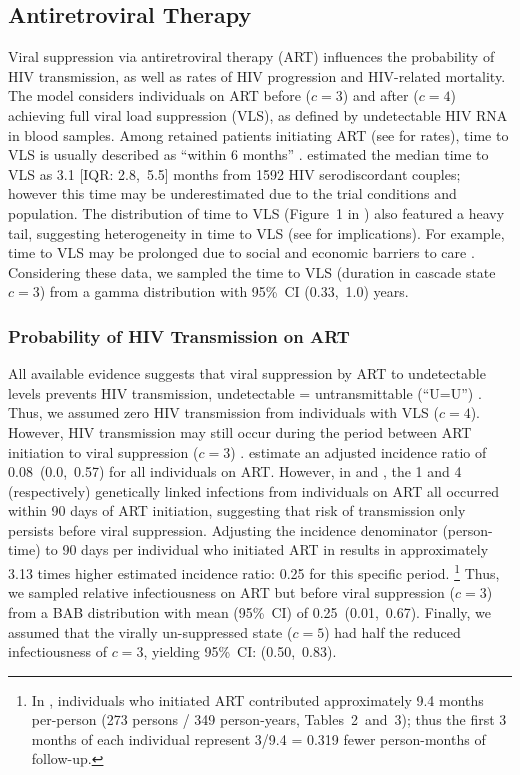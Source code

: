 \subsection{Antiretroviral Therapy}\label{mod.par.art}
Viral suppression via antiretroviral therapy (ART) influences
the probability of HIV transmission, as well as rates of HIV progression and HIV-related mortality.
The model considers individuals on ART before ($c=3$) and after ($c=4$)
achieving full viral load suppression (VLS), as defined by undetectable HIV RNA in blood samples.
Among retained patients initiating ART (see  for rates), time to VLS
is usually described as ``within 6 months'' \cite{Thompson2012}.
\citet{Mujugira2016} estimated the median time to VLS as 3.1 [IQR: 2.8,~5.5] months
from 1592 HIV serodiscordant couples;
however this time may be underestimated due to the trial conditions and population.
The distribution of time to VLS (Figure~1 in \cite{Mujugira2016}) also featured a heavy tail,
suggesting heterogeneity in time to VLS (see  for implications).
For example, time to VLS may be prolonged due to social and economic barriers to care
\cite{Dlamini-Simelane2017,Horter2019}.
Considering these data, we sampled the time to VLS (duration in cascade state $c=3$)
from a gamma distribution with 95\%~CI (0.33,~1.0) years.
\subsubsection{Probability of HIV Transmission on ART}\label{mod.par.art.beta}
All available evidence suggests that viral suppression by ART to undetectable levels
prevents HIV transmission, \ie undetectable = untransmittable (``U=U'') \cite{Eisinger2019uu}.
Thus, we assumed zero HIV transmission from individuals with VLS ($c=4$).
However, HIV transmission may still occur
during the period between ART initiation to viral suppression ($c=3$) \cite{Mujugira2016}.
\citet{Donnell2010} estimate an adjusted incidence ratio of 0.08~(0.0,~0.57) for all individuals on ART.
However, in \cite{Donnell2010} and \cite{Cohen2016}, the 1 and 4 (respectively)
genetically linked infections from individuals on ART all occurred within 90 days of ART initiation,
suggesting that risk of transmission only persists before viral suppression.
Adjusting the incidence denominator (person-time)
to 90 days per individual who initiated ART in \cite{Donnell2010}
results in approximately 3.13 times higher estimated incidence ratio: 0.25 for this specific period.%
\footnote{In \cite{Donnell2010}, individuals who initiated ART contributed
  approximately 9.4 months per-person (273 persons / 349 person-years, Tables~2~and~3);
  thus the first 3 months of each individual represent
  3/9.4 = 0.319 fewer person-months of follow-up.}
Thus, we sampled relative infectiousness on ART but before viral suppression ($c=3$)
from a BAB distribution with mean (95\%~CI) of 0.25~(0.01,~0.67).
Finally, we assumed that the virally un-suppressed state ($c=5$) had
half the reduced infectiousness of $c=3$, yielding 95\%~CI: (0.50,~0.83).
